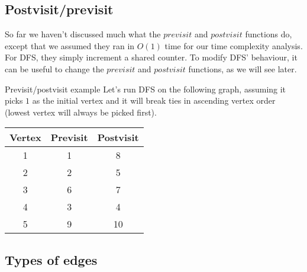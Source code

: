 \documentclass{article}
\begin{document}
\subsection{Postvisit/previsit}
So far we haven't discussed much what the $previsit$ and $postvisit$ functions do, except that we assumed they ran in $O(1)$ time for our time complexity analysis. For DFS, they simply increment a shared counter. To modify DFS' behaviour, it can be useful to change the $previsit$ and $postvisit$ functions, as we will see later.

\begin{example}{Previsit/postvisit example}
    Let's run DFS on the following graph, assuming it picks $1$ as the initial vertex and it will break ties in ascending vertex order (lowest vertex will always be picked first).

    \vspace{2mm}
    \begin{minipage}{0.5\linewidth}
    \centering
    \end{minipage}
    \begin{minipage}{0.5\linewidth}
    \centering
    \begin{tabular}{|c|c|c|}
        \hline
        Vertex & Previsit & Postvisit  \\
        \hline
        1 & 1 & 8 \\
        2 & 2 & 5 \\
        3 & 6 & 7 \\
        4 & 3 & 4 \\
        5 & 9 & 10  \\
        \hline
    \end{tabular}
    \end{minipage}
\end{example}


\subsection{Types of edges}
\end{document}
